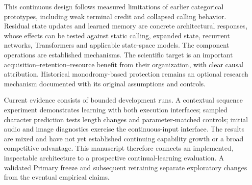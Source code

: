 This continuous design follows measured limitations of earlier categorical
prototypes, including weak terminal credit and collapsed calling behavior.
Residual state updates and learned memory are concrete architectural responses,
whose effects can be tested against static calling, expanded state, recurrent
networks, Transformers and applicable state-space models. The component
operations are established mechanisms. The scientific target is an important
acquisition--retention--resource benefit from their organization, with clear
causal attribution. Historical monodromy-based protection remains an optional
research mechanism documented with its original assumptions and controls.

Current evidence consists of bounded development runs. A contextual sequence
experiment demonstrates learning with both execution interfaces; sampled
character prediction tests length changes and parameter-matched controls;
initial audio and image diagnostics exercise the continuous-input interface.
The results are mixed and have not yet established continuing capability
growth or a broad competitive advantage. This manuscript therefore connects
an implemented, inspectable architecture to a prospective continual-learning
evaluation. A validated Primary freeze and subsequent retraining separate
exploratory changes from the eventual empirical claims.
